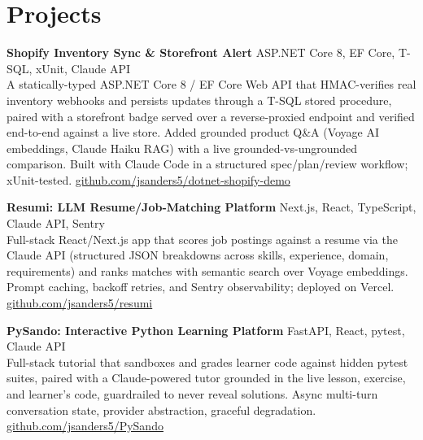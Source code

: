 \documentclass[10.5pt, letterpaper]{article}
\begin{document}
\section{Projects}

\noindent\textbf{Shopify Inventory Sync \& Storefront Alert}
\hfill\textcolor{muted}{\small ASP.NET Core 8, EF Core, T-SQL, xUnit, Claude API}\\
A statically-typed ASP.NET Core 8 / EF Core Web API that HMAC-verifies real
inventory webhooks and persists updates through a T-SQL stored procedure, paired
with a storefront badge served over a reverse-proxied endpoint and verified
end-to-end against a live store. Added grounded product Q\&A (Voyage AI
embeddings, Claude Haiku RAG) with a live grounded-vs-ungrounded comparison.
Built with Claude Code in a structured spec/plan/review workflow; xUnit-tested.
\hfill\textcolor{muted}{\small\href{https://github.com/jsanders5/dotnet-shopify-demo}{github.com/jsanders5/dotnet-shopify-demo}}

\vspace{5pt}

\noindent\textbf{Resumi: LLM Resume/Job-Matching Platform}
\hfill\textcolor{muted}{\small Next.js, React, TypeScript, Claude API, Sentry}\\
Full-stack React/Next.js app that scores job postings against a resume via the
Claude API (structured JSON breakdowns across skills, experience, domain,
requirements) and ranks matches with semantic search over Voyage embeddings.
Prompt caching, backoff retries, and Sentry observability; deployed on Vercel.
\hfill\textcolor{muted}{\small\href{https://github.com/jsanders5/resumi}{github.com/jsanders5/resumi}}

\vspace{5pt}

\noindent\textbf{PySando: Interactive Python Learning Platform}
\hfill\textcolor{muted}{\small FastAPI, React, pytest, Claude API}\\
Full-stack tutorial that sandboxes and grades learner code against hidden pytest
suites, paired with a Claude-powered tutor grounded in the live lesson, exercise,
and learner's code, guardrailed to never reveal solutions. Async multi-turn
conversation state, provider abstraction, graceful degradation.
\hfill\textcolor{muted}{\small\href{https://github.com/jsanders5/PySando}{github.com/jsanders5/PySando}}
\end{document}
